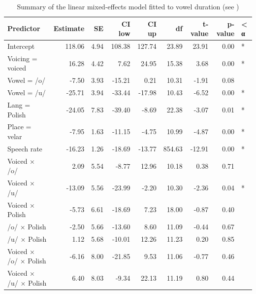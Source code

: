 \documentclass[charis]{glossa}
\begin{document}
\begin{table}[t]

\caption{\label{tab:vow-table}Summary of the linear mixed-effects model fitted to vowel duration (see )}
\centering
\fontsize{8}{10}\selectfont
\begin{tabular}{lrrrrrrrl}
\toprule
Predictor & Estimate & SE & CI low & CI up & df & t-value & p-value & < α\\
\midrule
Intercept & 118.06 & 4.94 & 108.38 & 127.74 & 23.89 & 23.91 & 0.00 & *\\
Voicing = voiced & 16.28 & 4.42 & 7.62 & 24.95 & 15.38 & 3.68 & 0.00 & *\\
Vowel = /o/ & -7.50 & 3.93 & -15.21 & 0.21 & 10.31 & -1.91 & 0.08 & \\
Vowel = /u/ & -25.71 & 3.94 & -33.44 & -17.98 & 10.43 & -6.52 & 0.00 & *\\
Lang = Polish & -24.05 & 7.83 & -39.40 & -8.69 & 22.38 & -3.07 & 0.01 & *\\
Place = velar & -7.95 & 1.63 & -11.15 & -4.75 & 10.99 & -4.87 & 0.00 & *\\
Speech rate & -16.23 & 1.26 & -18.69 & -13.77 & 854.63 & -12.91 & 0.00 & *\\
Voiced × /o/ & 2.09 & 5.54 & -8.77 & 12.96 & 10.18 & 0.38 & 0.71 & \\
Voiced × /u/ & -13.09 & 5.56 & -23.99 & -2.20 & 10.30 & -2.36 & 0.04 & *\\
Voiced × Polish & -5.73 & 6.61 & -18.69 & 7.23 & 18.00 & -0.87 & 0.40 & \\
/o/ × Polish & -2.50 & 5.66 & -13.60 & 8.60 & 11.09 & -0.44 & 0.67 & \\
/u/ × Polish & 1.12 & 5.68 & -10.01 & 12.26 & 11.23 & 0.20 & 0.85 & \\
Voiced × /o/ × Polish & -6.16 & 8.00 & -21.85 & 9.53 & 11.06 & -0.77 & 0.46 & \\
Voiced × /u/ × Polish & 6.40 & 8.03 & -9.34 & 22.13 & 11.19 & 0.80 & 0.44 & \\
\bottomrule
\end{tabular}
\end{table}
\end{document}
